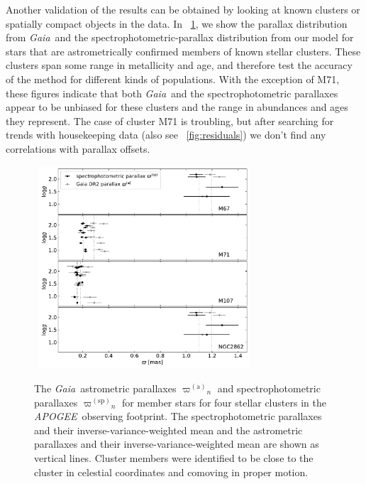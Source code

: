 \documentclass[modern]{aastex62}
\newcommand{\acronym}[1]{{\small{#1}}}
\newcommand{\project}[1]{\textsl{#1}}
\newcommand{\apogee}{\project{\acronym{APOGEE}}}
\newcommand{\gaia}{\project{Gaia}}
\newcommand{\gparallax}{{\varpi^{(\mathrm{a})}}}
\newcommand{\sparallax}{{\varpi^{(\mathrm{sp})}}}
\begin{document}
Another validation of the results can be obtained by looking at known
clusters or spatially compact objects in the data.
In \figurename~\ref{fig:clusters}, we show the parallax distribution from \gaia\ and
the spectrophotometric-parallax distribution from our model for stars that are
astrometrically confirmed members of known stellar clusters.
These clusters span some range in metallicity and age, and therefore test
the accuracy of the method for different kinds of populations.
With the exception of \acronym{M71}, these figures 
indicate that both \gaia\ and the spectrophotometric parallaxes appear to be unbiased
for these clusters and the range in abundances and ages they represent.
The case of cluster \acronym{M71} is troubling, but after searching for trends with
housekeeping data (also see \figurename~\ref{fig:residuals}) we don't find any correlations
with parallax offsets.
\begin{figure}
~\hfill\includegraphics[width=0.7\textwidth]{clusters.pdf}\hfill~
\caption{The \gaia\ astrometric parallaxes $\gparallax_n$
  and spectrophotometric parallaxes $\sparallax_n$ for member stars for
  four stellar clusters in the \apogee\ observing footprint. The spectrophotometric
  parallaxes and their inverse-variance-weighted mean and the astrometric parallaxes
  and their inverse-variance-weighted mean
  are shown as vertical lines.
  Cluster members were identified to be close to the cluster in celestial coordinates
  and comoving in proper motion.\label{fig:clusters}}
\end{figure}
\end{document}
